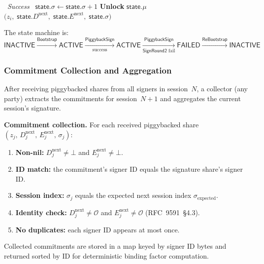 \documentclass[11pt,a4paper]{article}
\begin{document}
\begin{algorithm}[H]
\begin{algorithmic}[1]
\Statex \hrulefill\ \textit{Success}\ \hrulefill
\State $\mathsf{state}.\sigma \leftarrow \mathsf{state}.\sigma + 1$
\State \textbf{Unlock} $\mathsf{state}.\mu$
\State \Return $\bigl(z_i,\; \mathsf{state}.D^{\mathrm{next}},\;
  \mathsf{state}.E^{\mathrm{next}},\; \mathsf{state}.\sigma\bigr)$
\end{algorithmic}
\end{algorithm}

The state machine is:
\[
  \mathsf{INACTIVE}
  \xrightarrow{\mathsf{Bootstrap}}
  \mathsf{ACTIVE}
  \xrightarrow[\text{success}]{\mathsf{PiggybackSign}}
  \mathsf{ACTIVE}
  \xrightarrow[\mathsf{SignRound2}\text{ fail}]{\mathsf{PiggybackSign}}
  \mathsf{FAILED}
  \xrightarrow{\mathsf{ReBootstrap}}
  \mathsf{INACTIVE}
\]

\subsubsection{Commitment Collection and Aggregation}
\label{sec:piggyback-collect}

After receiving piggybacked shares from all signers in session~$N$, a
collector (any party) extracts the commitments for session~$N{+}1$ and
aggregates the current session's signature.

\medskip\noindent
\textbf{Commitment collection.}
For each received piggybacked share
$(z_j,\, D_j^{\mathrm{next}},\, E_j^{\mathrm{next}},\, \sigma_j)$:
\begin{enumerate}[nosep]
  \item \textbf{Non-nil:} $D_j^{\mathrm{next}} \ne \bot$ and
    $E_j^{\mathrm{next}} \ne \bot$.
  \item \textbf{ID match:} the commitment's signer ID equals the signature
    share's signer ID.
  \item \textbf{Session index:} $\sigma_j$ equals the expected next session
    index $\sigma_{\mathrm{expected}}$.
  \item \textbf{Identity check:} $D_j^{\mathrm{next}} \ne \mathcal{O}$ and
    $E_j^{\mathrm{next}} \ne \mathcal{O}$ (RFC~9591~\S4.3).
  \item \textbf{No duplicates:} each signer ID appears at most once.
\end{enumerate}
Collected commitments are stored in a map keyed by signer ID bytes and
returned sorted by ID for deterministic binding factor computation.
\end{document}
